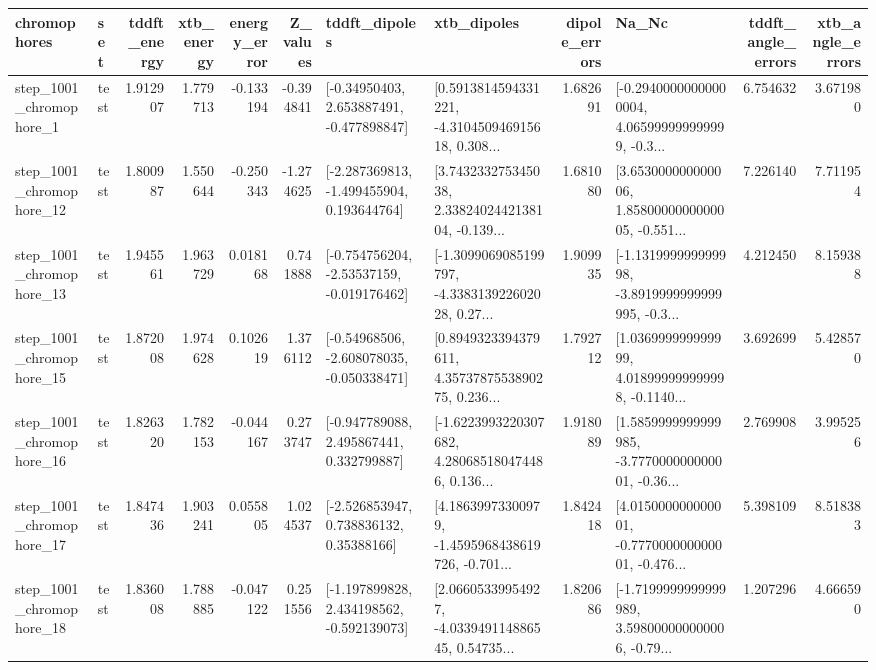 \begin{tabular}{llrrrrllrlrr}
\toprule
             chromophores &       set &  tddft\_energy &  xtb\_energy &  energy\_error &  Z\_values &                               tddft\_dipoles &                                        xtb\_dipoles &  dipole\_errors &                                              Na\_Nc &  tddft\_angle\_errors &  xtb\_angle\_errors \\
\midrule
  step\_1001\_chromophore\_1 &      test &      1.912907 &    1.779713 &     -0.133194 & -0.394841 &    [-0.34950403, 2.653887491, -0.477898847] &  [0.5913814594331221, -4.310450946915618, 0.308... &       1.682691 &  [-0.29400000000000004, 4.065999999999999, -0.3... &            6.754632 &          3.671980 \\
 step\_1001\_chromophore\_12 &      test &      1.800987 &    1.550644 &     -0.250343 & -1.274625 &   [-2.287369813, -1.499455904, 0.193644764] &  [3.743233275345038, 2.3382402442138104, -0.139... &       1.681080 &  [3.653000000000006, 1.8580000000000005, -0.551... &            7.226140 &          7.711954 \\
 step\_1001\_chromophore\_13 &      test &      1.945561 &    1.963729 &      0.018168 &  0.741888 &   [-0.754756204, -2.53537159, -0.019176462] &  [-1.3099069085199797, -4.338313922602028, 0.27... &       1.909935 &  [-1.131999999999998, -3.8919999999999995, -0.3... &            4.212450 &          8.159388 \\
 step\_1001\_chromophore\_15 &      test &      1.872008 &    1.974628 &      0.102619 &  1.376112 &   [-0.54968506, -2.608078035, -0.050338471] &  [0.8949323394379611, 4.3573787553890275, 0.236... &       1.792712 &  [1.036999999999999, 4.018999999999998, -0.1140... &            3.692699 &          5.428570 \\
 step\_1001\_chromophore\_16 &      test &      1.826320 &    1.782153 &     -0.044167 &  0.273747 &    [-0.947789088, 2.495867441, 0.332799887] &  [-1.6223993220307682, 4.280685180474486, 0.136... &       1.918089 &  [1.5859999999999985, -3.777000000000001, -0.36... &            2.769908 &          3.995256 \\
 step\_1001\_chromophore\_17 &      test &      1.847436 &    1.903241 &      0.055805 &  1.024537 &     [-2.526853947, 0.738836132, 0.35388166] &  [4.18639973300979, -1.4595968438619726, -0.701... &       1.842418 &  [4.015000000000001, -0.777000000000001, -0.476... &            5.398109 &          8.518383 \\
 step\_1001\_chromophore\_18 &      test &      1.836008 &    1.788885 &     -0.047122 &  0.251556 &   [-1.197899828, 2.434198562, -0.592139073] &  [2.06605339954927, -4.033949114886545, 0.54735... &       1.820686 &  [-1.7199999999999989, 3.598000000000006, -0.79... &            1.207296 &          4.666590 \\

\end{tabular}
